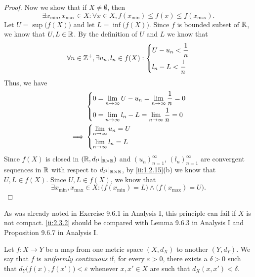 \begin{proof}
  Now we show that if \(X \neq \emptyset\), then
  \[
    \exists x_{\min}, x_{\max} \in X : \forall x \in X, f(x_{\min}) \leq f(x) \leq f(x_{\max}).
  \]
  Let \(U = \sup\big(f(X)\big)\) and let \(L = \inf\big(f(X)\big)\).
  Since \(f\) is bounded subset of \(\mathbb{R}\), we know that \(U, L \in \mathbb{R}\).
  By the definition of \(U\) and \(L\) we know that
  \[
    \forall n \in \mathbb{Z}^+, \exists u_n, l_n \in f(X) : \begin{dcases}
      U - u_n < \dfrac{1}{n} \\
      l_n - L < \dfrac{1}{n}
    \end{dcases}
  \]
  Thus, we have
  \begin{align*}
             & \begin{dcases}
                 0 = \lim_{n \to \infty} U - u_n = \lim_{n \to \infty} \dfrac{1}{n} = 0 \\
                 0 = \lim_{n \to \infty} l_n - L = \lim_{n \to \infty} \dfrac{1}{n} = 0
               \end{dcases} \\
    \implies & \begin{dcases}
                 \lim_{n \to \infty} u_n = U \\
                 \lim_{n \to \infty} l_n = L
               \end{dcases}
  \end{align*}
  Since \(f(X)\) is closed in \((\mathbb{R}, d_{l^1}|_{\mathbb{R} \times \mathbb{R}})\) and \((u_n)_{n = 1}^\infty\), \((l_n)_{n = 1}^\infty\) are convergent sequences in \(\mathbb{R}\) with respect to \(d_{l^1}|_{\mathbb{R} \times \mathbb{R}}\), by \cref{ii:1.2.15}(b) we know that \(U, L \in f(X)\).
  Since \(U, L \in f(X)\), we know that
  \[
    \exists x_{\min}, x_{\max} \in X : \big(f(x_{\min}) = L\big) \land \big(f(x_{\max}) = U\big).
  \]
\end{proof}

\begin{rmk}\label{ii:2.3.3}
  As was already noted in Exercise 9.6.1 in Analysis I, this principle can fail if \(X\) is not compact.
  \cref{ii:2.3.2} should be compared with Lemma 9.6.3 in Analysis I and Proposition 9.6.7 in Analysis I.
\end{rmk}

\begin{defn}\label{ii:2.3.4}
  Let \(f : X \to Y\) be a map from one metric space \((X, d_X)\) to another \((Y, d_Y)\).
  We say that \(f\) is \emph{uniformly continuous} if, for every \(\varepsilon > 0\), there exists a \(\delta > 0\) such that \(d_Y\big(f(x), f(x')\big) < \varepsilon\) whenever \(x, x' \in X\) are such that \(d_X(x, x') < \delta\).
\end{defn}

